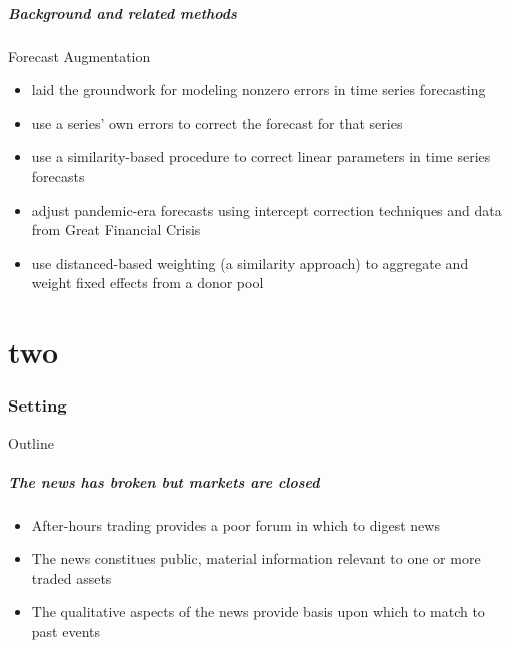 \documentclass{beamer}
\theoremstyle{definition}
\begin{document}
\begin{frame}
    \frametitle{Background and related methods}

    Forecast Augmentation
    \begin{itemize}
        \item \cite[][]{clements1996intercept,clements1998forecasting} laid the groundwork for modeling nonzero errors in time series forecasting
        \item \cite[][]{guerron2017macroeconomic} use a series' own errors to correct the forecast for that series
        \item \cite[][]{dendramis2020similarity} use a similarity-based procedure to correct linear parameters in time series forecasts
        \item \cite[][]{foroni2022forecasting} adjust pandemic-era forecasts using intercept correction techniques and data from Great Financial Crisis
        \item \cite[][]{lin2021minimizing} use distanced-based weighting (a similarity approach) to aggregate and weight fixed effects from a donor pool
    \end{itemize}
\end{frame}

\part{two}
\section{Setting}
\begin{frame}{Outline} %
    \tableofcontents[part=1,currentsection]\tableofcontents
\end{frame}


\begin{frame}
\frametitle{The news has broken but markets are closed}

\begin{itemize}
\item After-hours trading provides a poor forum in which to digest news
\item The news constitues public, material information relevant to one or more traded assets
\item The qualitative aspects of the news provide basis upon which to match to past events

\end{itemize}
\end{frame}
\end{document}
